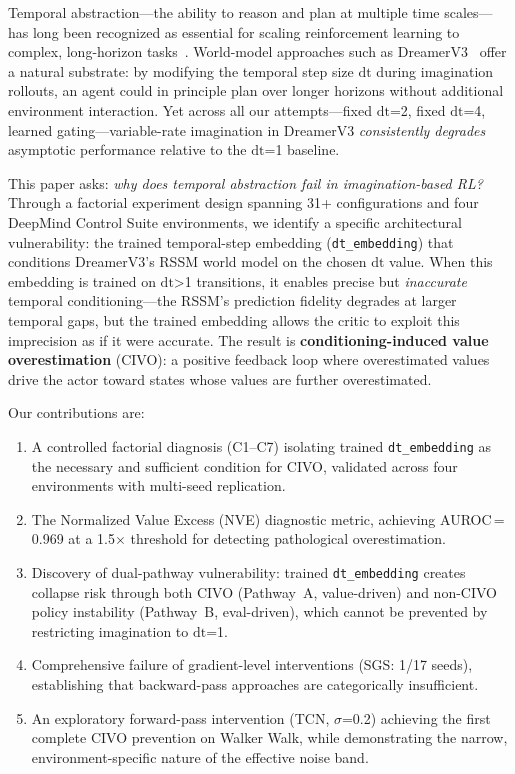 \documentclass{article}
\newcommand{\dt}{\mathrm{dt}}
\begin{document}
Temporal abstraction---the ability to reason and plan at multiple time scales---has long been recognized as essential for scaling reinforcement learning to complex, long-horizon tasks~\cite{sutton1999options,precup2000temporal}.
World-model approaches such as DreamerV3~\cite{hafner2023dreamerv3} offer a natural substrate: by modifying the temporal step size $\dt$ during imagination rollouts, an agent could in principle plan over longer horizons without additional environment interaction.
Yet across all our attempts---fixed $\dt$=2, fixed $\dt$=4, learned gating---variable-rate imagination in DreamerV3 \emph{consistently degrades} asymptotic performance relative to the $\dt$=1 baseline.

This paper asks: \emph{why does temporal abstraction fail in imagination-based RL?}
Through a factorial experiment design spanning 31+ configurations and four DeepMind Control Suite environments, we identify a specific architectural vulnerability: the trained temporal-step embedding (\texttt{dt\_embedding}) that conditions DreamerV3's RSSM world model on the chosen $\dt$ value.
When this embedding is trained on $\dt$>1 transitions, it enables precise but \emph{inaccurate} temporal conditioning---the RSSM's prediction fidelity degrades at larger temporal gaps, but the trained embedding allows the critic to exploit this imprecision as if it were accurate.
The result is \textbf{conditioning-induced value overestimation} (CIVO): a positive feedback loop where overestimated values drive the actor toward states whose values are further overestimated.

Our contributions are:
\begin{enumerate}[leftmargin=*,itemsep=2pt]
\item A controlled factorial diagnosis (C1--C7) isolating trained \texttt{dt\_embedding} as the necessary and sufficient condition for CIVO, validated across four environments with multi-seed replication.
\item The Normalized Value Excess (NVE) diagnostic metric, achieving AUROC\,=\,0.969 at a 1.5$\times$ threshold for detecting pathological overestimation.
\item Discovery of dual-pathway vulnerability: trained \texttt{dt\_embedding} creates collapse risk through both CIVO (Pathway~A, value-driven) and non-CIVO policy instability (Pathway~B, eval-driven), which cannot be prevented by restricting imagination to $\dt$=1.
\item Comprehensive failure of gradient-level interventions (SGS: 1/17 seeds), establishing that backward-pass approaches are categorically insufficient.
\item An exploratory forward-pass intervention (TCN, $\sigma$=0.2) achieving the first complete CIVO prevention on Walker Walk, while demonstrating the narrow, environment-specific nature of the effective noise band.
\end{enumerate}
\end{document}
